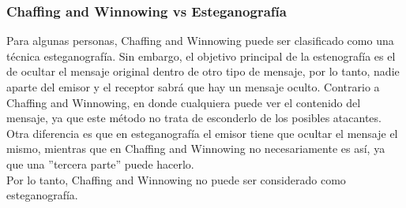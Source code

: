 \documentclass[12pt, a4paper, titlepage]{report}
\begin{document}
        \subsubsection{Chaffing and Winnowing vs Esteganograf\'ia}
        
        Para algunas personas, Chaffing and Winnowing puede ser clasificado como una técnica esteganograf\'ia. Sin embargo, el objetivo principal de la estenografía es el de ocultar el mensaje original dentro de otro tipo de mensaje, por lo tanto, nadie aparte del emisor y el receptor sabrá que hay un mensaje oculto. Contrario a Chaffing and Winnowing, en donde cualquiera puede ver el contenido del mensaje, ya que este método no trata de esconderlo de los posibles atacantes.\\
        Otra diferencia es que en esteganograf\'ia el emisor tiene que ocultar el mensaje el mismo, mientras que en Chaffing and Winnowing no necesariamente es así, ya que una ''tercera parte'' puede hacerlo.\\
        Por lo tanto, Chaffing and Winnowing no puede ser considerado como esteganograf\'ia.\\
        
\end{document}
